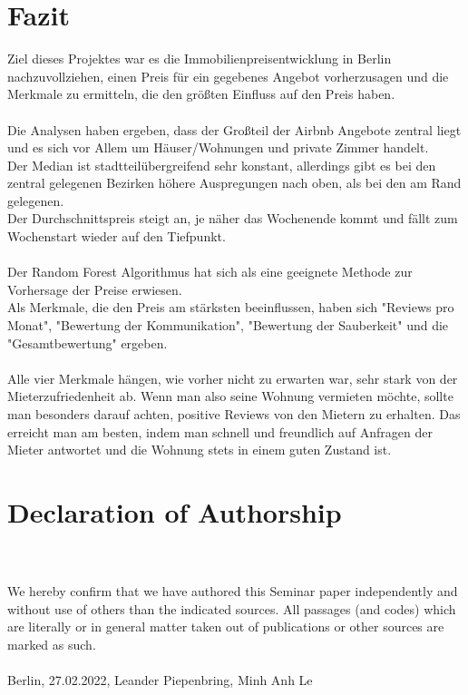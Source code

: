 \documentclass[12pt]{article}
\begin{document}
\begin{text}
\part{Fazit}
Ziel dieses Projektes war es die Immobilienpreisentwicklung in Berlin nachzuvollziehen, einen Preis für ein gegebenes Angebot vorherzusagen und die Merkmale zu ermitteln, die den größten Einfluss auf den Preis haben.\\\\
Die Analysen haben ergeben, dass der Großteil der Airbnb Angebote zentral liegt und es sich vor Allem um Häuser/Wohnungen und private Zimmer handelt.
\\
Der Median ist stadtteilübergreifend sehr konstant, allerdings gibt es bei den zentral gelegenen Bezirken höhere Auspregungen nach oben, als bei den am Rand gelegenen.
\\
Der Durchschnittspreis steigt an, je näher das Wochenende kommt und fällt zum Wochenstart wieder auf den Tiefpunkt.
\\\\
Der Random Forest Algorithmus hat sich als eine geeignete Methode zur Vorhersage der Preise erwiesen. 
\\
Als Merkmale, die den Preis am stärksten beeinflussen, haben sich "Reviews pro Monat", "Bewertung der Kommunikation", "Bewertung der Sauberkeit" und die "Gesamtbewertung" ergeben.
\\\\
Alle vier Merkmale hängen, wie vorher nicht zu erwarten war, sehr stark von der Mieterzufriedenheit ab. Wenn man also seine Wohnung vermieten möchte, sollte man besonders darauf achten, positive Reviews von den Mietern zu erhalten. Das erreicht man am besten, indem man schnell und freundlich auf Anfragen der Mieter antwortet und die Wohnung stets in einem guten Zustand ist.
\newpage
\part{Declaration of Authorship }
\\\\

We hereby confirm that we have authored this Seminar paper independently and without use of others than the indicated sources. All passages (and codes) which are literally or in general matter taken out of publications or other sources are marked as such.
\\\\

Berlin, 27.02.2022, Leander Piepenbring, Minh Anh Le



\end{text}
\end{document}
